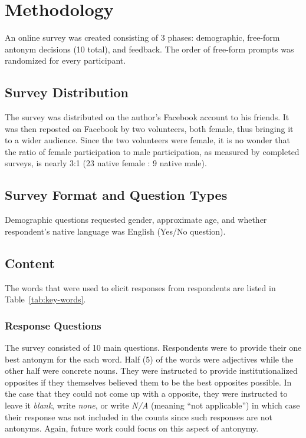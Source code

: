 \section {Methodology}
An online survey was created consisting of 3 phases: demographic, free-form antonym decisions (10 total), and feedback.  The order of free-form prompts was randomized for every participant.  %

\subsection{Survey Distribution} The survey was distributed on the author’s Facebook account to his friends.  It was then reposted on Facebook by two volunteers, both female, thus bringing it to a wider audience.  Since the two volunteers were female, it is no wonder that the ratio of female participation to male participation, as measured by completed surveys, is nearly 3:1 (23 native female : 9 native male).  

\subsection{Survey Format and Question Types} Demographic questions requested gender, approximate age, and whether respondent’s native language was English (Yes/No question).  


\subsection{Content} 
The words that were used to elicit responses from respondents are listed in Table~\ref{tab:key-words}.

\subsubsection{Response Questions}
The survey consisted of 10 main questions.  Respondents were to provide their one best antonym for the each word. Half (5) of the words were adjectives while the other half were concrete nouns.  They were instructed to provide institutionalized opposites if they themselves believed them to be the best opposites possible. In the case that they could not come up with a opposite, they were instructed to leave it \textit{blank}, write \textit{none}, or write \textit{N/A} (meaning ``not applicable'') in which case their response was not included in the counts since such responses are not antonyms.  Again, future work could focus on this aspect of antonymy.  

